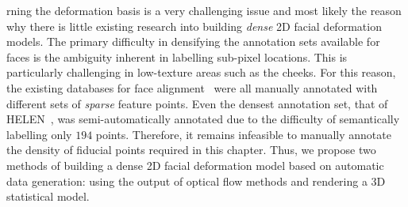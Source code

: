 rning the deformation basis is a very challenging issue and most likely the reason
why there is little existing research into building \textit{dense} 2D facial deformation models.
The primary difficulty in densifying the annotation sets available for faces
is the ambiguity inherent in labelling sub-pixel locations. This is particularly
challenging in low-texture areas such as the cheeks. For this reason, the
existing databases for face alignment~\cite{sagonas2013300,zhu2012face,%
belhumeur2013localizing,le2012interactive} were all manually annotated with
different sets of \textit{sparse} feature points.
Even the densest annotation set, that of HELEN~\cite{le2012interactive},
was semi-automatically annotated due to the difficulty of semantically
labelling only $194$ points. Therefore, it remains infeasible to manually
annotate the density of fiducial points required in this chapter. Thus, we
propose two methods of building a dense 2D facial deformation model based
on automatic data generation: using the output of optical flow methods and
rendering a 3D statistical model.

